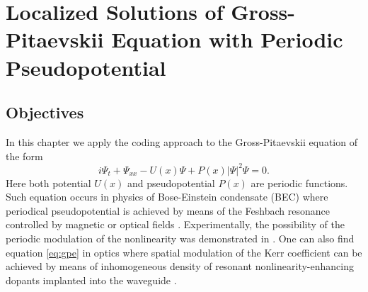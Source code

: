 \chapter{Localized Solutions of Gross-Pitaevskii Equation with Periodic Pseudopotential}
\label{chapter:III}

\section{Objectives}

In this chapter we apply the coding approach to the Gross-Pitaevskii equation of the form
\begin{equation}
	i \Psi_t + \Psi_{xx} - U(x) \Psi + P(x) |\Psi|^2 \Psi = 0.
\label{eq:gpe}
\end{equation}
Here both potential $U(x)$ and pseudopotential $P(x)$ are periodic functions.
Such equation occurs in physics of Bose-Einstein condensate (BEC) where periodical pseudopotential is achieved by means of the Feshbach resonance controlled by magnetic or optical fields \cite{PollackDriesJunkerChenCorcovilosHulet, ChinGrimmJulienneTsienga, BauerLetterVoRempeDurr}.
Experimentally, the possibility of the periodic modulation of the nonlinearity was demonstrated in \cite{YamazakiTaieSugawaTakahashi}.
One can also find equation \eqref{eq:gpe} in optics where spatial modulation of the Kerr coefficient can be achieved by means of inhomogeneous density of resonant nonlinearity-enhancing dopants implanted into the waveguide \cite{HukriedeRundeKip}.

